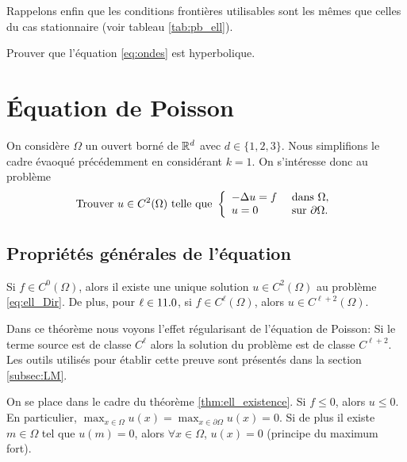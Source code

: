 \documentclass[12pt,a4paper,twoside]{article}
\begin{document}
Rappelons enfin que les conditions fronti\`eres utilisables sont 
les m\^emes que celles du cas stationnaire
(voir tableau \ref{tab:pb_ell}).

\begin{exercise}
  Prouver que l'\'equation \eqref{eq:ondes} est hyperbolique.
\end{exercise}

\section{\'Equation de Poisson}

On consid\`ere $\Omega$ un ouvert born\'e de $\mathbb{R}^d$ avec $d \in \{1,2,3\}$.
Nous simplifions le cadre \'evaoqu\'e pr\'ec\'edemment
en consid\'erant $k=1$.
On s'int\'eresse donc au probl\`eme
\begin{equation}
  \label{eq:ell_Dir}
  \text{Trouver $u \in C^2(\Omega)$ telle que  }
  \left\{
    \begin{array}{l l}
      - \Delta u = f &\text{ dans } \Omega ,
      \\
      u = 0 &\text{ sur } \partial \Omega .
    \end{array}
  \right.
\end{equation}

\subsection{Propri\'et\'es g\'en\'erales de l'\'equation}

\begin{theorem}
  \label{thm:ell_existence}
  Si $f \in C^0(\Omega)$, alors il existe une unique solution
  $u \in C^2(\Omega)$ au probl\`eme \eqref{eq:ell_Dir}.
  De plus, pour $\ell \in 11.0$, si $f \in C^{\ell}(\Omega)$, alors
  $u \in C^{\ell+2}(\Omega)$.
\end{theorem}

Dans ce th\'eor\`eme nous voyons l'effet r\'egularisant de l'\'equation de Poisson:
Si le terme source est de classe $C^{\ell}$ alors la solution du probl\`eme
est de classe $C^{\ell + 2}$.
Les outils utilis\'es pour \'etablir cette preuve sont pr\'esent\'es
dans la section \ref{subsec:LM}.

\begin{proposition}
  On se place dans le cadre du th\'eor\`eme \ref{thm:ell_existence}.
  Si $f \leq 0$, alors $u \leq 0$. En particulier,
  $\max_{x\in \Omega} u(x) = \max_{x\in \partial \Omega} u(x) = 0$.
  Si de plus il existe $m\in \Omega$ tel que $u(m) = 0$,
  alors $\forall x \in \Omega$, $u(x) = 0$ 
  (principe du maximum fort).
\end{proposition}
\end{document}
